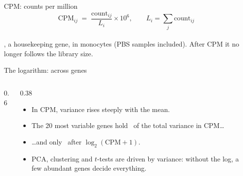 \begin{frame}{CPM: counts per million}
  \[
    \text{CPM}_{ij}\;=\;\frac{\text{count}_{ij}}{L_i}\times 10^{6},\qquad L_i=\sum_{j}\text{count}_{ij}
  \]
  \centering
  \\[-2pt]
  \small {}, a housekeeping gene, in monocytes (PBS samples included). After CPM it no longer follows the library size.
\end{frame}

\begin{frame}{The logarithm: across genes}
  \begin{columns}[c]
    \begin{column}{0.6\linewidth}
    \end{column}
    \begin{column}{0.38\linewidth}\small
      \begin{itemize}\setlength\itemsep{3pt}
        \item In CPM, \alert{variance rises steeply with the mean}.
        \item The 20 most variable genes hold \numtoptwentycpm\ of the total variance in CPM\ldots{}
        \item \ldots{}and only \numtoptwentylog\ after $\log_2(\text{CPM}+1)$.
        \item PCA, clustering and $t$-tests are driven by variance: without the log, a few abundant genes decide everything.
      \end{itemize}
    \end{column}
  \end{columns}
\end{frame}

